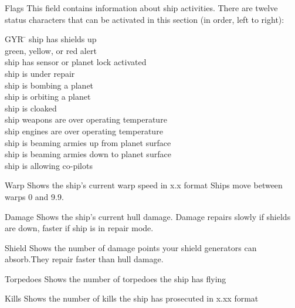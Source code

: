 \begin{list}{}{
	\renewcommand{\makelabel}[1]{{\tt #1 \hfill}}
         \setlength{\leftmargin}{2.75cm}
         \setlength{\labelwidth}{\leftmargin}
         \setlength{\labelsep}{0in}
}
\item[Flags]
	This field contains information about ship activities.  There
	are twelve status characters that can be activated in this
	section (in order, left to right):

	\begin{tabbing}
        GYR \= \kill
	 \> ship has shields up \\
	 \> green, yellow, or red alert \\
	 \> ship has sensor or planet lock activated \\
	 \> ship is under repair \\
	 \> ship is bombing a planet \\
	 \> ship is orbiting a planet \\
	 \> ship is cloaked \\
	 \> ship weapons are over operating temperature \\
	 \> ship engines are over operating temperature \\
	 \> ship is beaming armies up from planet surface \\
	 \> ship is beaming armies down to planet surface \\
	 \> ship is allowing co-pilots \\
	\end{tabbing}

\item[Warp] Shows the ship's current warp speed in x.x format
             Ships move between warps 0 and 9.9.

\item[Damage] Shows the ship's current hull damage.
	Damage repairs slowly if shields
	are down, faster if ship is in repair mode.

\item[Shield] Shows the number of damage points your shield
	generators can absorb.They repair faster than hull damage.

\item[Torpedoes] Shows the number of torpedoes the ship has flying

\item[Kills] Shows the number of kills the ship has prosecuted in x.xx format


\end{list}
